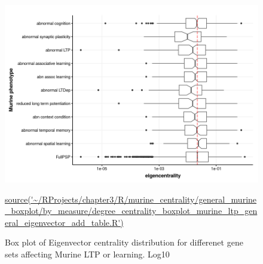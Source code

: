 




\begin{figure}
    \centering
    \includegraphics[width=\textwidth]{images/chapter3/ggplot2/murine_centrality_boxplot/add_theme/addLTP/Rplot_eigen_edit.png}
    \caption{Box plot of Eigenvector centrality distribution for differenet gene sets affecting Murine LTP or learning. Log10} 
   \tiny\url{source('~/RProjects/chapter3/R/murine_centrality/general_murine_boxplot/by_measure/degree_centrality_boxplot_murine_ltp_general_eigenvector_add_table.R')}
    \label{fig:murine_ltp_centrality_boxplot_eigenvector}
\end{figure}


